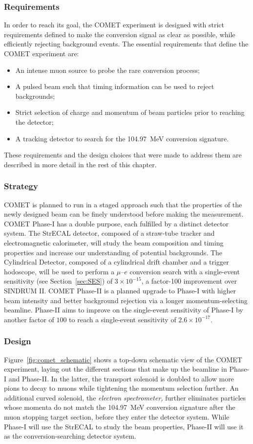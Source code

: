 \subsubsection{Requirements}
In order to reach its goal, the COMET experiment is designed with strict
requirements defined to make the conversion signal as clear as possible, while
efficiently rejecting background events. The essential requirements that define
the COMET experiment are:
\begin{itemize}
    \item An intense muon source to probe the rare conversion process;
    \item A pulsed beam such that timing information can be used to reject
    backgrounds;
    \item Strict selection of charge and momentum of beam particles prior to
    reaching the detector;
    \item A tracking detector to search for the \SI{104.97}{\MeV} conversion
    signature.
\end{itemize}
These requirements and the design choices that were made to address them are
described in more detail in the rest of this chapter.

\subsubsection{Strategy}
COMET is planned to run in a staged approach such that the properties of the
newly designed beam can be finely understood before making the measurement.
COMET Phase-I has a double purpose, each fulfilled by a distinct detector
system. The StrECAL detector, composed of a straw-tube tracker and
electromagnetic calorimeter, will study the beam composition and timing
properties and increase our understanding of potential backgrounds. The
Cylindrical Detector, composed of a cylindrical drift chamber and a trigger
hodoscope, will be used to perform a $\mu$--$e$ conversion search with a
single-event sensitivity (see Section~\ref{sec:SES}) of $3\times 10^{-15}$, a
factor-100 improvement over SINDRUM II. COMET Phase-II is a planned upgrade to
Phase-I with higher beam intensity and better background rejection via a longer
momentum-selecting beamline. Phase-II aims to improve on the single-event
sensitivity of Phase-I by another factor of $100$ to reach a single-event
sensitivity of $2.6\times 10^{-17}$.

\subsubsection{Design}
Figure~\ref{fig:comet_schematic} shows a top-down schematic view of the COMET
experiment, laying out the different sections that make up the beamline in
Phase-I and Phase-II. In the latter, the transport solenoid is doubled to allow
more pions to decay to muons while tightening the momentum selection further. An
additional curved solenoid, the \emph{electron spectrometer,} further eliminates
particles whose momenta do not match the \SI{104.97}{\MeV} conversion signature
after the muon stopping target section, before they enter the detector system.
While Phase-I will use the StrECAL to study the beam properties, Phase-II will
use it as the conversion-searching detector system.

